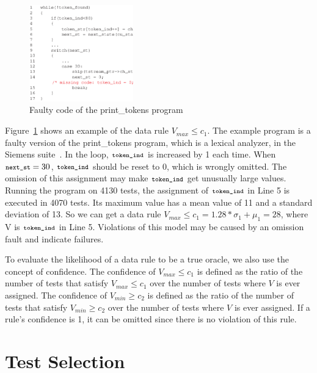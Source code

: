 \documentclass{sig-alternate}
\newcommand{\CodeIn}[1]{{\small\texttt{#1}}}
\begin{document}
\begin{figure}[h]
  \includegraphics[angle=0,width=0.4\textwidth]{figs/example31.eps}
  \centering
  \caption{Faulty code of the print\_tokens program}
  \label{fig:example3}
\end{figure}

Figure~\ref{fig:example3} shows an example of the data rule
$V_{max}\le c_1$. The example program is a faulty version of the
print\_tokens program, which is a lexical analyzer, in the Siemens
suite~\cite{Hutchins94}. In the loop, $\CodeIn{token\_ind}$ is
increased by 1 each time. When $\CodeIn{next\_st}=30$,
$\CodeIn{token\_ind}$ should be reset to 0, which is wrongly
omitted. The omission of this assignment may make
$\CodeIn{token\_ind}$ get unusually large values. Running the
program on 4130 tests, the assignment of $\CodeIn{token\_ind}$ in
Line 5 is executed in 4070 tests. Its maximum value has a mean value
of 11 and a standard deviation of 13. So we can get a data rule
$V_{max}\le c_1=1.28*\sigma_1+\mu_1=28$, where V is
$\CodeIn{token\_ind}$ in Line 5. Violations of this model may be
caused by an omission fault and indicate failures.



To evaluate the likelihood of a data rule to be a true oracle, we
also use the concept of confidence. The confidence of $V_{max}\le
c_1$ is defined as the ratio of the number of tests that satisfy
$V_{max}\le c_1$ over the number of tests where $V$ is ever
assigned. The confidence of $V_{min}\ge c_2$ is defined as the ratio
of the number of tests that satisfy $V_{min}\ge c_2$ over the number
of tests where $V$ is ever assigned. If a rule's confidence is 1, it
can be omitted since there is no violation of this rule.




\section{Test Selection} \label{sec:select}
\end{document}
